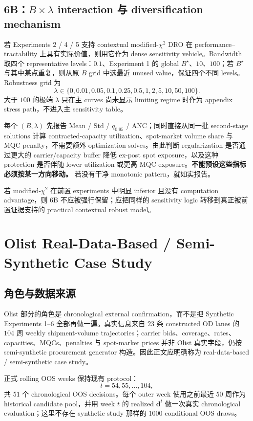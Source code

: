 \documentclass[11pt,a4paper]{ctexart}
\begin{document}
\subsection{6B：$B\times\lambda$ interaction 与 diversification mechanism}

若 Experiments 2 / 4 / 5 支持 contextual modified-$\chi^2$ DRO 在 performance--tractability 上具有实际价值，则用它作为 dense sensitivity vehicle。Bandwidth 取四个 representative levels：$0.1$、Experiment 1 的 global $B^\star$、$10$、$100$；若 $B^\star$ 与其中某点重复，则从原 $B$ grid 中选最近 unused value，保证四个不同 levels。Robustness grid 为
\[
\lambda\in\{0,0.01,0.05,0.1,0.25,0.5,1,2,5,10,50,100\}.
\]
大于 $100$ 的极端 $\lambda$ 只在主 curves 尚未显示 limiting regime 时作为 appendix stress path，不进入主 sensitivity table。

每个 $(B,\lambda)$ 先报告 Mean / Std / $q_{0.95}$ / ANC；同时直接从同一批 second-stage solutions 计算 contracted-capacity utilization、spot-market volume share 与 MQC penalty，不需要额外 optimization solves。由此判断 regularization 是否通过更大的 carrier/capacity buffer 降低 ex-post spot exposure，以及这种 protection 是否伴随 lower utilization 或更高 MQC exposure。\textbf{不能预设这些指标必须按某一方向移动。} 若没有干净 monotonic pattern，就如实报告。

若 modified-$\chi^2$ 在前置 experiments 中明显 inferior 且没有 computation advantage，则 6B 不应被强行保留；应把同样的 sensitivity logic 转移到真正被前置证据支持的 practical contextual robust model。

\section{Olist Real-Data-Based / Semi-Synthetic Case Study}

\subsection{角色与数据来源}

Olist 部分的角色是 chronological external confirmation，而不是把 Synthetic Experiments 1--6 全部再做一遍。真实信息来自 $23$ 条 constructed OD lanes 的 $104$ 周 weekly shipment-volume trajectories；carrier bids、coverage、rates、capacities、MQCs、penalties 与 spot-market prices 并非 Olist 真实字段，仍按 semi-synthetic procurement generator 构造。因此正文应明确称为 real-data-based / semi-synthetic case study。

正式 rolling OOS weeks 保持现有 protocol：
\[
t=54,55,\ldots,104,
\]
共 $51$ 个 chronological OOS decisions。每个 outer week 使用之前最近 $50$ 周作为 historical candidate pool，并用 week $t$ 的 realized $\boldsymbol d^t$ 做一次真实 chronological evaluation；这里不存在 synthetic study 那样的 $1000$ conditional OOS draws。
\end{document}
